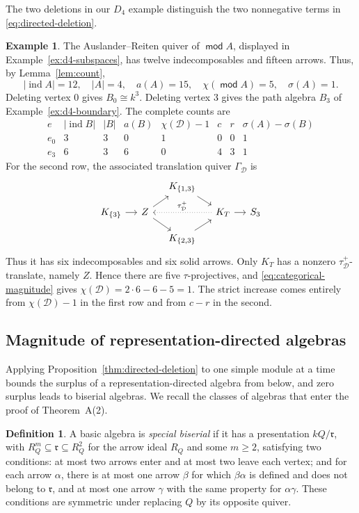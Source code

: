 \documentclass[a4paper,reqno,10pt]{amsart}
\theoremstyle{definition}
\newtheorem{definition}[theorem]{Definition}
\newtheorem{example}[theorem]{Example}
\numberwithin{equation}{section}
\DeclareMathOperator{\moduleCategory}{\mathsf{mod}}
\renewcommand{\mod}{\moduleCategory}
\DeclareMathOperator{\ind}{ind}
\newcommand{\cD}{\mathcal D}
\begin{document}
The two deletions in our \(D_4\) example distinguish the two nonnegative
terms in \eqref{eq:directed-deletion}.
\begin{example}\label{ex:d4-deletion}
The Auslander--Reiten quiver of \(\mod A\), displayed in
Example~\ref{ex:d4-subspaces}, has twelve indecomposables and fifteen
arrows. Thus, by Lemma~\ref{lem:count},
\[
 |\ind A|=12,\quad |A|=4,\quad a(A)=15,\quad
 \chi(\mod A)=5,\quad\sigma(A)=1.
\]
Deleting vertex 0 gives \(B_0\cong k^3\). Deleting vertex 3 gives the
path algebra \(B_3\) of Example~\ref{ex:d4-boundary}.
The complete counts are
\[
\begin{array}{c|ccc|ccc|c}
 e&|\ind B|&|B|&a(B)&\chi(\cD)-1&c&r&\sigma(A)-\sigma(B)\\\hline
 e_0&3&3&0&1&0&0&1\\
 e_3&6&3&6&0&4&3&1
\end{array}
\]
For the second row, the associated translation quiver \(\Gamma_{\cD}\) is
\[
\begin{tikzcd}[column sep=small,row sep=small]
 &&K_{\{1,3\}}\arrow[dr]&&\\
 K_{\{3\}}\arrow[r]&Z\arrow[ur]\arrow[dr]&&
 K_T\arrow[r]\arrow[ll,dotted,"\tau_{\cD}^+"']&S_3\\
 &&K_{\{2,3\}}\arrow[ur]&&
\end{tikzcd}
\]
Thus it has six indecomposables and six solid arrows. Only
\(K_T\) has a nonzero \(\tau_{\cD}^+\)-translate, namely \(Z\).
Hence there are five \(\tau\)-projectives, and
\eqref{eq:categorical-magnitude} gives \(\chi(\cD)=2\cdot6-6-5=1\). The strict increase comes entirely from
\(\chi(\cD)-1\) in the first row and from \(c-r\) in the second.
\end{example}
\subsection{Magnitude of representation-directed algebras}\label{subsec:directed-case}
Applying Proposition~\ref{thm:directed-deletion} to one simple module at a
time bounds the surplus of a representation-directed algebra from below,
and zero surplus leads to biserial algebras. We recall the classes of
algebras that enter the proof of Theorem~A(2).
\begin{definition}\label{def:special-biserial}
A basic algebra is \emph{special biserial} if it has a presentation
\(kQ/\mathfrak r\), with \(R_Q^m\subseteq\mathfrak r\subseteq R_Q^2\)
for the arrow ideal \(R_Q\) and some \(m\geq2\), satisfying two conditions:
at most two arrows enter and at most two leave each vertex; and for each
arrow \(\alpha\), there is at most one arrow \(\beta\) for which
\(\beta\alpha\) is defined and does not belong to \(\mathfrak r\),
and at most one arrow \(\gamma\) with the same property for
\(\alpha\gamma\). These conditions are symmetric under replacing \(Q\) by
its opposite quiver.
\end{definition}
\end{document}
